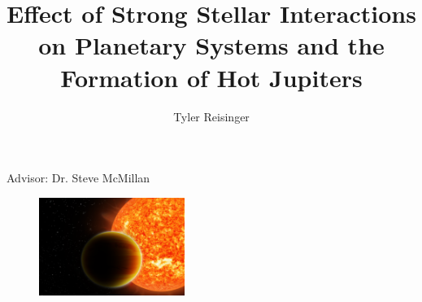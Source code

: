 \documentclass{beamer}
\title{Effect of Strong Stellar Interactions on Planetary Systems and
            the Formation of Hot Jupiters}
\author{Tyler Reisinger}
\date{}
\begin{document}

\begin{frame}
    \maketitle
    \begin{center}
        Advisor: Dr. Steve McMillan
    \end{center}
    \begin{figure}
        \centering
        \includegraphics[height=1.25in]{Image1_HotJupiter1}
    \end{figure}
\end{frame}
\end{document}
